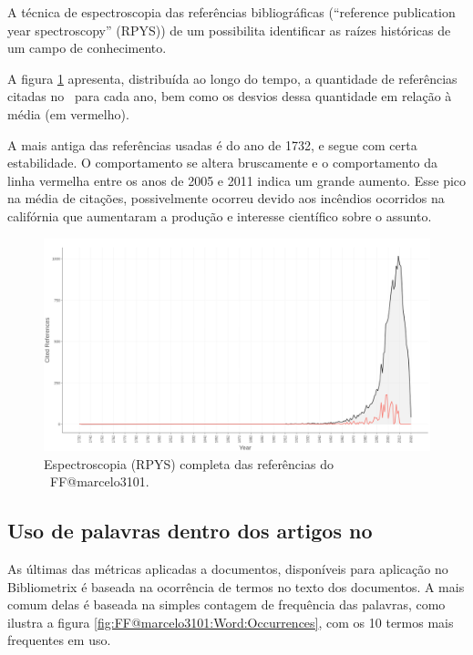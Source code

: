 A técnica de espectroscopia das referências bibliográficas (``reference publication year spectroscopy'' (RPYS)) de um \dataset\cite{marx_detecting_2014} possibilita identificar as raízes históricas  de um campo de conhecimento. 

A figura \ref{fig:FF@marcelo3101:ReferenceSpectroscopy} apresenta, distribuída ao longo do tempo, a quantidade de referências citadas no \dataset\, para cada ano, bem como os desvios dessa quantidade em relação à média (em vermelho). 

A mais antiga das referências usadas é do ano de 1732, e segue com certa estabilidade. O comportamento se altera bruscamente e o comportamento da linha vermelha entre os anos de 2005 e 2011 indica um grande aumento. Esse pico na média de citações, possivelmente ocorreu devido aos incêndios ocorridos na califórnia que aumentaram a produção e interesse científico sobre o assunto.

\begin{figure}
    \centering
    \includegraphics[width=1\textwidth]{exploratory-data-analysis/marcelo3101/PesqBibliogr/ForestFire/WoS-20221204/assets/ReferenceSpectroscopyFFmarcelo3101.png}
    \caption{Espectroscopia (RPYS) completa das referências do \dataset\ FF@marcelo3101.}
    \label{fig:FF@marcelo3101:ReferenceSpectroscopy}
\end{figure}

\subsection{Uso de palavras dentro dos artigos no \dataset}

As últimas das métricas aplicadas a documentos, disponíveis para aplicação no Bibliometrix é baseada na ocorrência de termos no texto dos documentos. A mais comum delas é baseada na simples contagem de frequência das palavras, como ilustra a figura \ref{fig:FF@marcelo3101:Word:Occurrences}, com os 10 termos mais frequentes em uso.


